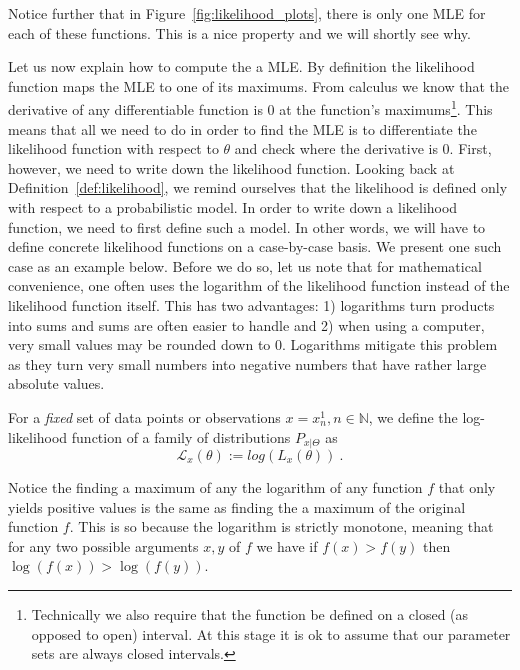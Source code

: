 Notice further that in Figure~\ref{fig:likelihood_plots}, there is only one MLE for each of these functions. This is a nice property and we will shortly see why.

Let us now explain how to compute the a MLE. By definition the likelihood function maps the MLE to
one of its maximums. From calculus we know that the derivative of any differentiable function is 0 at the
function's maximums\footnote{Technically we also require that the function be defined on a closed 
(as opposed to open) interval. At this stage it is ok to assume that our parameter sets are always closed
intervals.}. This means that all we need to do in order to find the MLE is to differentiate the likelihood 
function with respect to $ \theta $ and check where the derivative is 0. 
First, however, we need to write down the likelihood function.
Looking back at Definition~\ref{def:likelihood}, we remind ourselves that the likelihood is defined only
with respect to a probabilistic model. In order to write down a likelihood function, we need to first
define such a model. In other words, we will have to define concrete likelihood functions on a case-by-case 
basis. We present one such case as an example below. Before we do so, let us note that for mathematical
convenience, one often uses the logarithm of the likelihood function instead of the likelihood function
itself. This has two advantages: 1) logarithms turn products into sums and sums are often easier to handle
and 2) when using a computer, very small values may be rounded down to 0. Logarithms mitigate this problem
as they turn very small numbers into negative numbers that have rather large absolute values.

\begin{Definition}
For a \emph{fixed} set of data points or observations $ x = x^{1}_{n}, n \in \mathbb{N} $, we define the 
log-likelihood function of a 
family of distributions $ P_{x|\Theta} $ as 
$$ \mathcal{L}_{x}(\theta) := log \left(L_{x}(\theta) \right) \ . $$
\end{Definition}

Notice the finding a maximum of any the logarithm of any function $ f $ that only yields positive values is the same as finding
the a maximum of the original function $ f $. This is so because the logarithm is strictly monotone, meaning that for any
two possible arguments $ x,y $ of $ f $ we have if $ f(x) > f(y) $ then $ \log(f(x)) > \log(f(y)) $.

